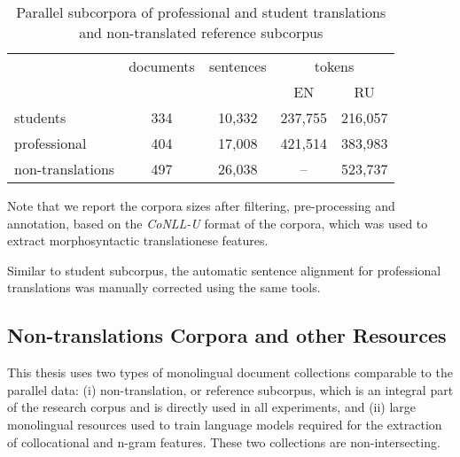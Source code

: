 \begin{table}[H]
	\centering
	\begin{tabular}{l|c|c|cc}
	\toprule
	
	             & documents & sentences & \multicolumn{2}{c}{tokens} \\
				 &      &        & EN      &  RU \\
	\midrule
	students     & 334  & 10,332 & 237,755 & 216,057 \\  
	professional & 404  & 17,008 & 421,514 & 383,983 \\ 
	non-translations & 497  & 26,038 & -- & 523,737 \\  
	\bottomrule
\end{tabular}
	\caption{\label{tab:vars} Parallel subcorpora of professional and student translations and non-translated reference subcorpus}
\end{table}

Note that we report the corpora sizes after filtering, pre-processing and annotation, based on the \textit{CoNLL-U} format of the corpora, which was used to extract morphosyntactic translationese features.

Similar to student subcorpus, the automatic sentence alignment for professional translations was manually corrected using the same tools. 

\subsection{\label{ssec:ref}Non-translations Corpora and other Resources}

This thesis uses two types of monolingual document collections comparable to the parallel data: (i) non-translation, or reference subcorpus, which is an integral part of the research corpus and is directly used in all experiments, and (ii) large monolingual resources used to train language models required for the extraction of collocational and n-gram features. 
These two collections are non-intersecting.  

